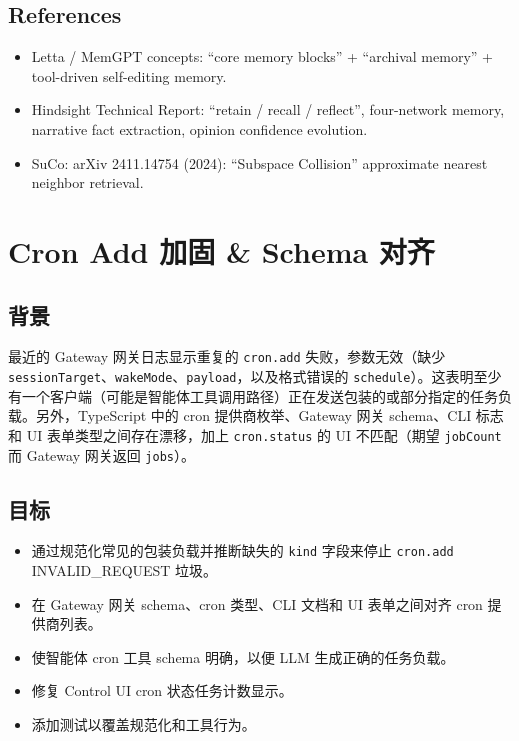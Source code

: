 \subsection{References}


\begin{itemize}
  \item Letta / MemGPT concepts: “core memory blocks” + “archival memory” + tool-driven self-editing memory.
  \item Hindsight Technical Report: “retain / recall / reflect”, four-network memory, narrative fact extraction, opinion confidence evolution.
  \item SuCo: arXiv 2411.14754 (2024): “Subspace Collision” approximate nearest neighbor retrieval.
\end{itemize}



\clearpage
\section{Cron Add 加固 \& Schema 对齐}


\subsection{背景}


最近的 Gateway 网关日志显示重复的 \texttt{cron.add} 失败，参数无效（缺少 \texttt{sessionTarget}、\texttt{wakeMode}、\texttt{payload}，以及格式错误的 \texttt{schedule}）。这表明至少有一个客户端（可能是智能体工具调用路径）正在发送包装的或部分指定的任务负载。另外，TypeScript 中的 cron 提供商枚举、Gateway 网关 schema、CLI 标志和 UI 表单类型之间存在漂移，加上 \texttt{cron.status} 的 UI 不匹配（期望 \texttt{jobCount} 而 Gateway 网关返回 \texttt{jobs}）。

\subsection{目标}


\begin{itemize}
  \item 通过规范化常见的包装负载并推断缺失的 \texttt{kind} 字段来停止 \texttt{cron.add} INVALID\_REQUEST 垃圾。
  \item 在 Gateway 网关 schema、cron 类型、CLI 文档和 UI 表单之间对齐 cron 提供商列表。
  \item 使智能体 cron 工具 schema 明确，以便 LLM 生成正确的任务负载。
  \item 修复 Control UI cron 状态任务计数显示。
  \item 添加测试以覆盖规范化和工具行为。
\end{itemize}


